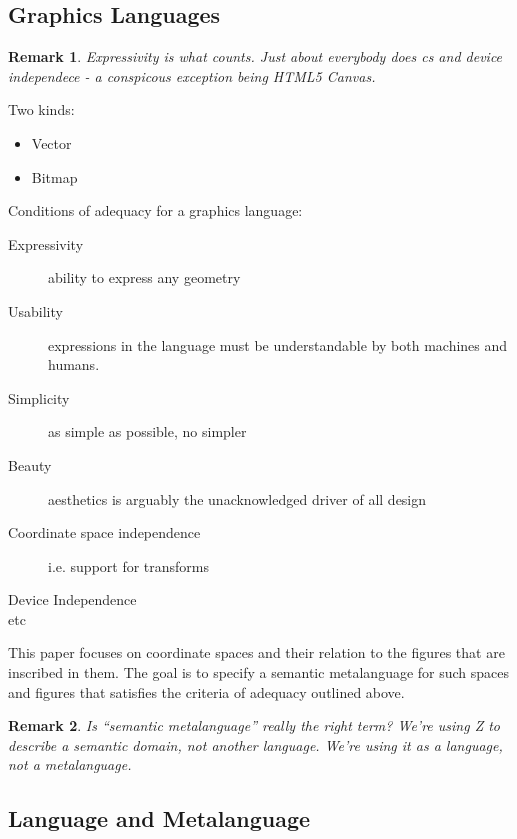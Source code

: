 \documentclass[12pt]{tufte-handout}
\numberwithin{equation}{subsection}
\numberwithin{equation}{subsection}
\newtheorem{remark}{Remark}
\begin{document}
\subsection{Graphics Languages}
\label{subs:reqts}

\begin{remark}
  Expressivity is what counts.  Just about everybody does cs and
  device independece - a conspicous exception being HTML5 Canvas.
\end{remark}

Two kinds:

\begin{itemize}
\item Vector
\item Bitmap
\end{itemize}

Conditions of adequacy for a graphics language:

\begin{description}
\item [Expressivity] ability to express any geometry
\item [Usability] expressions in the language must be understandable
  by both machines and humans.
\item [Simplicity] as simple as possible, no simpler
\item [Beauty] aesthetics is arguably the unacknowledged driver of
  all design
\item [Coordinate space independence] i.e. support for transforms
\item [Device Independence]
\item [etc]
\end{description}

This paper focuses on coordinate spaces and their relation to the
figures that are inscribed in them.  The goal is to specify a semantic
metalanguage for such spaces and figures that satisfies the criteria
of adequacy outlined above.

\begin{remark}
  Is ``semantic metalanguage'' really the right term?  We're using Z
  to describe a semantic domain, not another language.  We're using it
  as a language, not a metalanguage.
\end{remark}

\subsection{Language and Metalanguage}
\label{subs:langmetalang}
\end{document}
